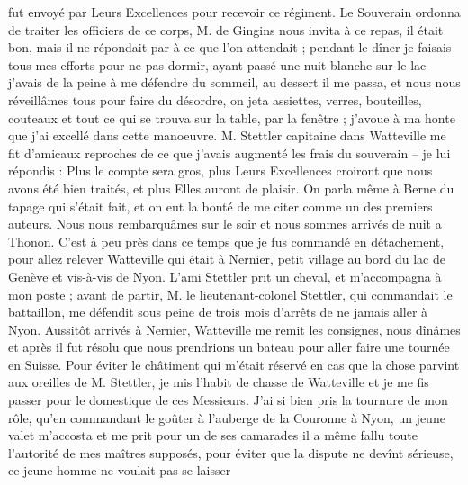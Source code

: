 \documentclass[12pt]{article}
\begin{document}
 fut envoyé par Leurs Excellences pour recevoir ce
régiment. Le Souverain ordonna de traiter les officiers de ce corps, M. de Gingins nous invita à ce
repas, il était bon, mais il ne répondait par à ce que l’on attendait ; pendant le dîner je faisais
tous mes efforts pour ne pas dormir, ayant passé une nuit blanche sur le lac j’avais de la peine à
me défendre du sommeil, au dessert il me passa, et nous nous réveillâmes tous pour faire du
désordre, on jeta assiettes, verres, bouteilles, couteaux et tout ce qui se trouva sur la table, par
la fenêtre ; j’avoue à ma honte que j’ai excellé dans cette manoeuvre. M. Stettler capitaine dans
Watteville me fit d’amicaux reproches de ce que j’avais augmenté les frais du souverain – je lui
répondis : Plus le compte sera gros, plus Leurs Excellences croiront que nous avons été bien
traités, et plus Elles auront de plaisir. On parla même à Berne du tapage qui s’était fait, et on
eut la bonté de me citer comme un des premiers auteurs. Nous nous rembarquâmes sur le soir et nous
sommes arrivés de nuit a Thonon. C’est à peu près dans ce temps que je fus commandé en détachement,
pour allez relever Watteville qui était à Nernier, petit village au bord du lac de Genève et
vis-à-vis de Nyon. L’ami Stettler prit un cheval, et m’accompagna à mon poste ; avant de partir, M.
le lieutenant-colonel Stettler, qui commandait le battaillon, me défendit sous peine de trois mois
d’arrêts de ne jamais aller à Nyon. Aussitôt arrivés à Nernier, Watteville me remit les consignes,
nous dînâmes et après il fut résolu que nous prendrions un bateau pour aller faire une tournée en
Suisse. Pour éviter le châtiment qui m’était réservé en cas que la chose parvint aux oreilles de M.
Stettler, je mis l’habit de chasse de Watteville et je me fis passer pour le domestique de ces
Messieurs. J’ai si bien pris la tournure de mon rôle, qu’en commandant le goûter à l’auberge de la
Couronne à Nyon, un jeune valet m’accosta et me prit pour un de ses camarades il a même fallu toute
l’autorité de mes maîtres supposés, pour éviter que la dispute ne devînt sérieuse, ce jeune homme ne
voulait pas se laisser
\end{document}
